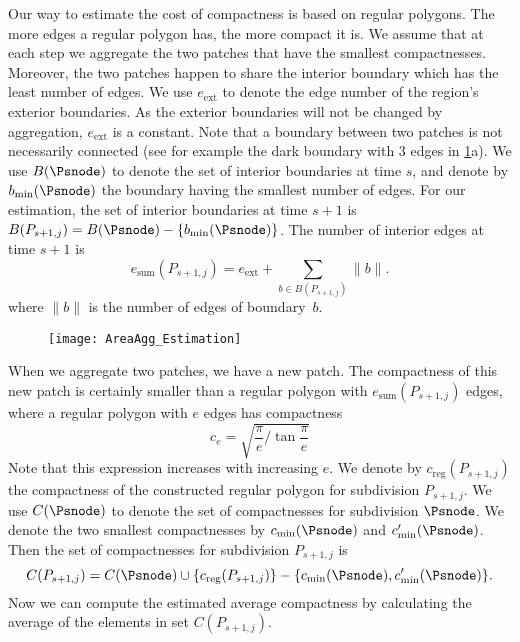 Our way to estimate the cost of compactness 
is based on regular polygons.
The more edges a regular polygon has, the more compact it is.
We assume that at each step 
we aggregate the two patches that have the smallest 
compactnesses.
Moreover, the two patches happen to share the interior boundary 
which has the least number of edges.
We use $e_\mathrm{ext}$ to 
denote the edge number of the region's exterior boundaries.
As the exterior boundaries will not be changed by aggregation, 
$e_\mathrm{ext}$ 
is a constant. 
%
Note that a boundary between two patches is not necessarily 
connected 
(see for example the dark boundary with $3$ edges in
\fig\ref{fig:AreaAgg_h_comp}a).
We use $B(\Psnode)$ to denote the set of interior boundaries at 
time $s$,
and denote by $b_\mathrm{min}(\Psnode)$ 
the boundary having the smallest number of edges.
For our estimation, the set of interior boundaries at time $s+1$ 
is
$B(P_{s+1,j})= B(\Psnode)-{\{b_\mathrm{min}(\Psnode)\}}$. 
%
The number of interior edges at time $s+1$ is
\begin{equation}
\label{eq:LeftEdgeNum}
e_\mathrm{sum}(P_{s+1,j})=e_\mathrm{ext} + \sum_{b \in 
B(P_{s+1,j})} \|b\|.
\end{equation}
where $\|b\|$ is the number of edges of boundary~$b$.

\begin{figure*}[tb]
	\centering
	\texttt{[image: AreaAgg\_Estimation]}
	\label{fig:AreaAgg_h_comp}
\end{figure*}


When we aggregate two patches, we have a new patch.
The compactness of this new patch is certainly smaller than 
a regular polygon with $e_\mathrm{sum}(P_{s+1,j})$ edges,
where a regular polygon with $e$ edges has compactness
\[
c_e=\sqrt{\frac{\pi}{e}\bigg/\tan{\frac{\pi}{e}}}
\]
Note that this expression increases with increasing $e$.
We denote by $c_\mathrm{reg} (P_{s+1,j})$ the compactness 
of the constructed regular polygon for subdivision 
$P_{s+1,j}$.
We use $C(\Psnode)$ to denote the set of compactnesses for 
subdivision $\Psnode$.
We denote the two smallest compactnesses by 
$c_\mathrm{min}(\Psnode)$ and $c'_\mathrm{min}(\Psnode)$.
Then the set of compactnesses for subdivision $P_{s+1,j}$ is 
\begin{equation}
\label{eq:compsetnew}
C(P_{s+1,j})=C(\Psnode) 
\cup \{c_\mathrm{reg} (P_{s+1,j})\} 
- \{c_\mathrm{min}(\Psnode), c'_\mathrm{min}(\Psnode)\}.
\end{equation}
Now we can compute the estimated average compactness by 
calculating the average 
of the elements in set $C(P_{s+1,j})$.

